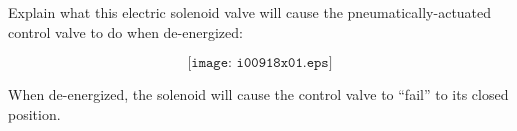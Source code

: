 

Explain what this electric solenoid valve will cause the pneumatically-actuated control valve to do when de-energized:

$$\texttt{[image: i00918x01.eps]}$$







When de-energized, the solenoid will cause the control valve to ``fail'' to its closed position.











